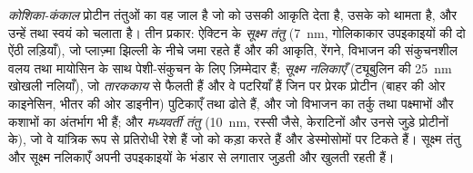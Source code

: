 \begin{definition}[कोशिका-कंकाल]\label{def:b1:eukaryotic-cell:cytoskeleton}
\emph{कोशिका-कंकाल} प्रोटीन तंतुओं का वह जाल है जो
 को उसकी आकृति देता है, उसके  को थामता है, और उन्हें तथा
स्वयं  को चलाता है। तीन प्रकार: ऐक्टिन के \emph{सूक्ष्म
तंतु} (\qty{7}{nm}, गोलिकाकार उपइकाइयों की दो ऐंठी
लड़ियाँ), जो प्लाज़्मा झिल्ली के नीचे जमा रहते हैं और  की आकृति,
रेंगने, विभाजन की संकुचनशील वलय तथा मायोसिन के साथ पेशी-संकुचन के लिए
ज़िम्मेदार हैं; \emph{सूक्ष्म नलिकाएँ}
(ट्यूबुलिन की \qty{25}{nm} खोखली नलियाँ), जो
\emph{तारककाय} से फैलती हैं और वे पटरियाँ हैं जिन पर
प्रेरक प्रोटीन (बाहर की ओर काइनेसिन, भीतर की ओर डाइनीन) पुटिकाएँ तथा
 ढोते हैं, और जो विभाजन का तर्कु तथा पक्ष्माभों और कशाभों का
अंतर्भाग भी हैं; और \emph{मध्यवर्ती तंतु}
(\qty{10}{nm}, रस्सी जैसे, केराटिनों और उनसे जुड़े प्रोटीनों के), जो वे
यांत्रिक रूप से प्रतिरोधी रेशे हैं जो  को कड़ा करते हैं और
डेस्मोसोमों पर टिकते हैं। सूक्ष्म तंतु और सूक्ष्म नलिकाएँ अपनी उपइकाइयों
के भंडार से लगातार जुड़ती और खुलती रहती हैं।
\end{definition}

